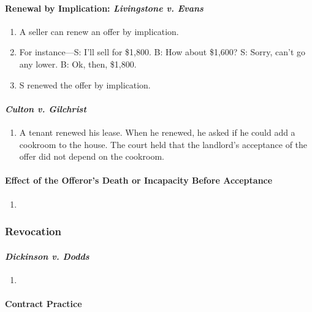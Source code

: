 \paragraph{Renewal by Implication: \emph{Livingstone v. Evans}}

\begin{enumerate}
    \item A seller can renew an offer by implication.
    \item For instance---S: I'll sell for \$1,800. B: How about \$1,600? S: 
    Sorry, can't go any lower. B: Ok, then, \$1,800.
    \item S renewed the offer by implication.
\end{enumerate}

\paragraph{\emph{Culton v. Gilchrist}}

\begin{enumerate}
    \item A tenant renewed his lease. When he renewed, he asked if he could 
    add a cookroom to the house. The court held that the landlord's acceptance 
    of the offer did not depend on the cookroom.
\end{enumerate}

\paragraph{Effect of the Offeror's Death or Incapacity Before Acceptance}

\begin{enumerate}
    \item %
\end{enumerate}

\subsubsection{Revocation}

\paragraph{\emph{Dickinson v. Dodds}}

\begin{enumerate}
    \item %
\end{enumerate}

\paragraph{Contract Practice}

